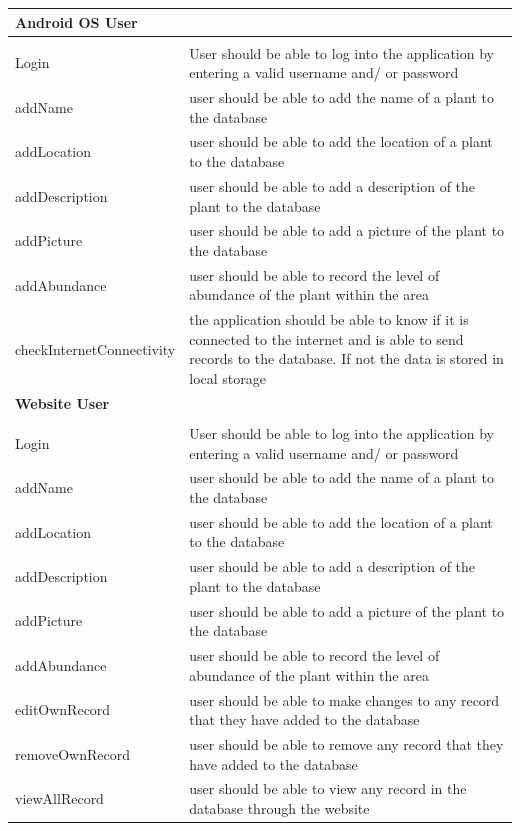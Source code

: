 \documentclass[11pt, titlepage]{article}
\begin{document}
			\begin{tabu} to 1\textwidth {X[l] | X[l]}
			
				\hline \textbf{Android OS User} & \\ \hline \\
				Login & User should be able to log into the application by entering a valid username and/ or password \\
					addName & user should be able to add the name of a plant to the database \\
					addLocation & user should be able to add the location of a plant to the database \\
					addDescription & user should be able to add a description of the plant to the database \\
					addPicture & user should be able to add a picture of the plant to the database \\
					addAbundance & user should be able to record the level of abundance of the plant within the area \\
					checkInternetConnectivity & the application should be able to know if it is connected to the internet and is able to send records to the database. If not the data is stored in local storage \\
				\hline \textbf{Website User} &  \\ \hline \\
					Login & User should be able to log into the application by entering a valid username and/ or password \\
					addName & user should be able to add the name of a plant to the database \\
					addLocation & user should be able to add the location of a plant to the database \\
					addDescription & user should be able to add a description of the plant to the database \\
					addPicture & user should be able to add a picture of the plant to the database \\
					addAbundance & user should be able to record the level of abundance of the plant within the area \\
					editOwnRecord & user should be able to make changes to any record that they have added to the database \\
					removeOwnRecord & user should be able to remove any record that they have added to the database \\
					viewAllRecord & user should be able to view any record in the database through the website \\
				\end{tabu}
\end{document}
